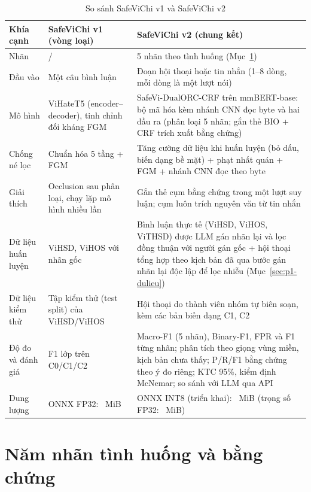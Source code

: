 \begin{table}[H]
\centering
\caption{So sánh SafeViChi v1 và SafeViChi v2}
\label{tab:p1-v1v2}
\small
\begin{tabularx}{\linewidth}{@{}p{2.6cm}YY@{}}
\toprule
\textbf{Khía cạnh} & \textbf{SafeViChi v1 (vòng loại)} & \textbf{SafeViChi v2 (chung kết)} \\
\midrule
Nhãn &  /  & 5 nhãn theo tình huống (Mục~\ref{sec:p1-nhan}) \\
Đầu vào & Một câu bình luận & Đoạn hội thoại hoặc tin nhắn (1--8 dòng, mỗi dòng là một lượt nói) \\
Mô hình & ViHateT5 (encoder--decoder), tinh chỉnh đối kháng FGM & SafeVi-DualORC-CRF trên mmBERT-base: bộ mã hóa kèm
  nhánh CNN đọc byte và hai đầu ra (phân loại 5 nhãn; gắn thẻ BIO + CRF trích xuất bằng chứng) \\
Chống né lọc & Chuẩn hóa 5 tầng + FGM & Tăng cường dữ liệu khi huấn luyện (bỏ dấu, biến dạng bề mặt) + phạt nhất quán
  + FGM + nhánh CNN đọc theo byte \\
Giải thích & Occlusion sau phân loại, chạy lặp mô hình nhiều lần & Gắn thẻ cụm bằng chứng trong một lượt
  suy luận; cụm luôn trích nguyên văn từ tin nhắn \\
Dữ liệu huấn luyện & ViHSD, ViHOS với nhãn gốc & Bình luận thực tế (ViHSD, ViHOS, ViTHSD) được LLM gán nhãn lại và lọc
  đồng thuận với người gán gốc + hội thoại tổng hợp theo kịch bản đã qua bước gán nhãn lại độc lập để lọc nhiễu
  (Mục~\ref{sec:p1-dulieu}) \\
Dữ liệu kiểm thử & Tập kiểm thử (test split) của ViHSD/ViHOS & Hội thoại do thành viên nhóm tự biên soạn, kèm các bản
  biến dạng C1, C2 \\
Độ đo và đánh giá & F1 lớp  trên C0/C1/C2 & Macro-F1 (5 nhãn), Binary-F1, FPR và F1 từng nhãn; phân tích theo
  giọng vùng miền, kịch bản chưa thấy; P/R/F1 bằng chứng theo ý đo riêng; KTC 95\%, kiểm định McNemar; so sánh với LLM
  qua API \\
Dung lượng & ONNX FP32: ~MiB & ONNX INT8 (triển khai): ~MiB (trọng số FP32:
  ~MiB) \\
\bottomrule
\end{tabularx}
\end{table}

\section{Năm nhãn tình huống và bằng chứng}
\label{sec:p1-nhan}

